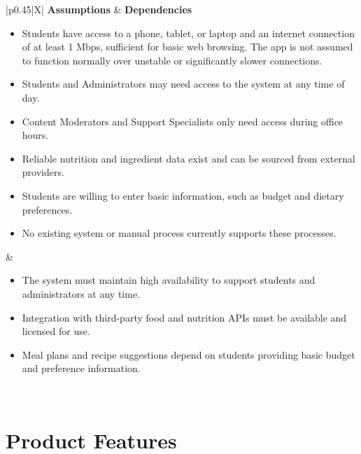 \documentclass[10pt,letterpaper]{article}
\begin{document}
\begin{table}[h!]
\centering
\caption{Assumptions and dependencies for Healthy Living}
\label{tab:assumptions-dependencies}
\begin{tabularx}{\textwidth}{|p{0.45\textwidth}|X|}
\hline
\textbf{Assumptions} & \textbf{Dependencies} \\
\hline
\begin{minipage}[t]{\linewidth}
\begin{itemize}[leftmargin=2em, itemsep=4pt, topsep=2pt]
  \item[A1] Students have access to a phone, tablet, or laptop and an internet connection of at least 1 Mbps, sufficient for basic web browsing. The app is not assumed to function normally over unstable or significantly slower connections.
  \item[A2] Students and Administrators may need access to the system at any time of day.
  \item[A3] Content Moderators and Support Specialists only need access during office hours.
  \item[A4] Reliable nutrition and ingredient data exist and can be sourced from external providers.
  \item[A5] Students are willing to enter basic information, such as budget and dietary preferences.
  \item[A6] No existing system or manual process currently supports these processes.
\end{itemize}
\end{minipage}
&
\begin{minipage}[t]{\linewidth}
\begin{itemize}[leftmargin=2em, itemsep=4pt, topsep=2pt]
  \item[D1] The system must maintain high availability to support students and administrators at any time.
  \item[D2] Integration with third-party food and nutrition APIs must be available and licensed for use.
  \item[D3] Meal plans and recipe suggestions depend on students providing basic budget and preference information.
\end{itemize}
\end{minipage}
\\
\hline
\end{tabularx}
\end{table}

\section{Product Features}
\end{document}
